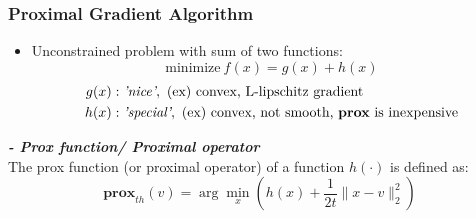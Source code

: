\documentclass{beamer}
\begin{document}

\begin{frame}
\frametitle{Proximal Gradient Algorithm}
\begin{itemize}
\item Unconstrained problem with sum of two functions:
\begin{equation}
\textrm{minimize}~f(x)=g(x)+h(x)
\end{equation}
\vspace{-2.5em}
\begin{align*}
g(x)&: \textit{'nice'}, \text{ (ex) convex, L-lipschitz gradient}\\
h(x)&: \textit{'special'}, \text{ (ex) convex, not smooth, \textbf{prox} is inexpensive}
\end{align*}
\end{itemize}
\begin{definition}
\textbf{\em{- Prox function/ Proximal operator}}\\
The prox function (or proximal operator) of a function $h(\cdot)$ is defined as:
\begin{equation}
\textbf{prox}_{th}(v) = \arg\min_{x} \left( h(x)+\frac{1}{2t}\|x-v\|_2^2 \right)
\end{equation}
\end{definition}

\end{frame}
\end{document}

